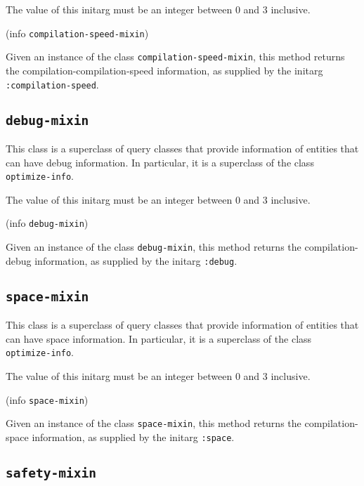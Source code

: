 
The value of this initarg must be an integer between $0$ and $3$
inclusive.

 {(info {\tt compilation-speed-mixin})}

Given an instance of the class \texttt{compilation-speed-mixin}, this method
returns the compilation-compilation-speed information, as supplied by the initarg
\texttt{:compilation-speed}.

\subsection{\texttt{debug-mixin}}
\label{sec-debug-mixin}

This class is a superclass of query classes that provide information
of entities that can have debug information.  In particular, it is a
superclass of the class \texttt{optimize-info}.


The value of this initarg must be an integer between $0$ and $3$
inclusive.

 {(info {\tt debug-mixin})}

Given an instance of the class \texttt{debug-mixin}, this method
returns the compilation-debug information, as supplied by the initarg
\texttt{:debug}.

\subsection{\texttt{space-mixin}}
\label{sec-space-mixin}

This class is a superclass of query classes that provide information
of entities that can have space information.  In particular, it is a
superclass of the class \texttt{optimize-info}.


The value of this initarg must be an integer between $0$ and $3$
inclusive.

 {(info {\tt space-mixin})}

Given an instance of the class \texttt{space-mixin}, this method
returns the compilation-space information, as supplied by the initarg
\texttt{:space}.

\subsection{\texttt{safety-mixin}}
\label{sec-safety-mixin}

